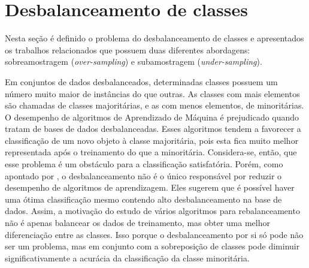 %

\section{Desbalanceamento de classes}
\label{cap:desbalanceamento}

Nesta seção é definido o problema do desbalanceamento de classes e apresentados os trabalhos relacionados que possuem duas diferentes abordagens: sobreamostragem (\textit{over-sampling}) e subamostragem (\textit{under-sampling}).

Em conjuntos de dados desbalanceados, determinadas classes possuem um número muito maior de instâncias do que outras. As classes com mais elementos são chamadas de classes majoritárias, e as com menos elementos, de minoritárias. O desempenho de algoritmos de Aprendizado de Máquina é prejudicado quando tratam de bases de dados desbalanceadas. Esses algoritmos tendem a favorecer a classificação de um novo objeto à classe majoritária, pois esta fica muito melhor representada após o treinamento do que a minoritária. Considera-se, então, que esse problema é um obstáculo para a classificação satisfatória. Porém, como apontado por \cite{Batista2004}, o desbalanceamento não é o único responsável por reduzir o desempenho de algoritmos de aprendizagem. Eles sugerem que é possível haver uma ótima classificação mesmo contendo alto desbalanceamento na base de dados. Assim, a motivação do estudo de vários algoritmos para rebalanceamento não é apenas balancear os dados de treinamento, mas obter uma melhor diferenciação entre as classes. Isso porque o desbalanceamento por si só pode não ser um problema, mas em conjunto com a sobreposição de classes pode diminuir significativamente a acurácia da classificação da classe minoritária.

